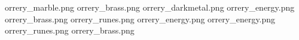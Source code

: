 orrery_marble.png
orrery_brass.png
orrery_darkmetal.png
orrery_energy.png
orrery_brass.png
orrery_runes.png
orrery_energy.png
orrery_energy.png
orrery_runes.png
orrery_brass.png
